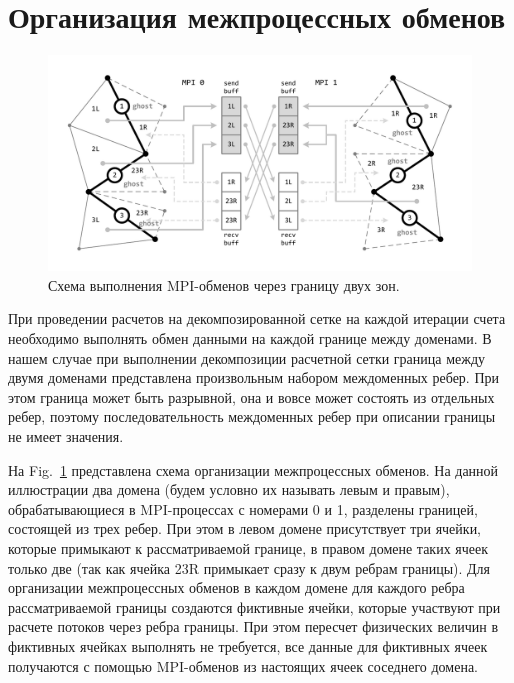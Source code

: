 \documentclass[
11pt,%
tightenlines,%
twoside,%
onecolumn,%
nofloats,%
nobibnotes,%
nofootinbib,%
superscriptaddress,%
noshowpacs,%
centertags]%
{revtex4}
\begin{document}
\section{Организация межпроцессных обменов}

\begin{figure}[h]
\includegraphics[width=1.0\textwidth]{pics/04-MPI.pdf}
\caption{Схема выполнения MPI-обменов через границу двух зон.}\label{fig:04-MPI}
\end{figure}

При проведении расчетов на декомпозированной сетке на каждой итерации счета необходимо выполнять обмен данными на каждой границе между доменами.
В нашем случае при выполнении декомпозиции расчетной сетки граница между двумя доменами представлена произвольным набором междоменных ребер.
При этом граница может быть разрывной, она и вовсе может состоять из отдельных ребер, поэтому последовательность междоменных ребер при описании границы не имеет значения.

На Fig.~\ref{fig:04-MPI} представлена схема организации межпроцессных обменов.
На данной иллюстрации два домена (будем условно их называть левым и правым), обрабатывающиеся в MPI-процессах с номерами 0 и 1, разделены границей, состоящей из трех ребер.
При этом в левом домене присутствует три ячейки, которые примыкают к рассматриваемой границе, в правом домене таких ячеек только две (так как ячейка 23R примыкает сразу к двум ребрам границы).
Для организации межпроцессных обменов в каждом домене для каждого ребра рассматриваемой границы создаются фиктивные ячейки, которые участвуют при расчете потоков через ребра границы.
При этом пересчет физических величин в фиктивных ячейках выполнять не требуется, все данные для фиктивных ячеек получаются с помощью MPI-обменов из настоящих ячеек соседнего домена.
\end{document}
